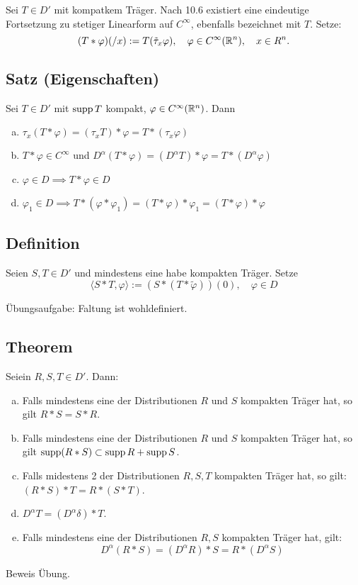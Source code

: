 Sei $T \in D'$ mit kompatkem Träger.
Nach 10.6 existiert eine eindeutige Fortsetzung zu stetiger Linearform auf $C^\infty$, ebenfalls bezeichnet mit $T$.
Setze:
$$
(T \ast \varphi)(/x) := T(\tilde\tau_x \varphi), \quad \varphi \in C^\infty(\mathbb{R}^n), \quad x \in R^n.
$$

\subsection{Satz (Eigenschaften)}

Sei $T \in D'$ mit $\operatorname{supp} T$ kompakt, $\varphi \in C^\infty(\mathbb{R}^n)$.
Dann
\begin{enumerate}[a)]
  \item $\tau_x(T\ast \varphi) = (\tau_x T) \ast \varphi = T \ast (\tau_x \varphi)$
  \item $T \ast \varphi \in C^\infty$ und $D^\alpha (T\ast \varphi) = (D^\alpha T) \ast \varphi = T \ast (D^\alpha \varphi)$
  \item $\varphi \in D \implies T\ast \varphi \in D$
  \item $\varphi_1 \in D \implies T \ast (\varphi \ast \varphi_1) = (T \ast \varphi ) \ast \varphi_1 = (T \ast \varphi) \ast \varphi$
\end{enumerate}

\subsection{Definition}

Seien $S,T \in D'$ und mindestens eine habe kompakten Träger.
Setze
$$
\langle S \ast T, \varphi \rangle := (S \ast (T \ast \tilde \varphi))(0), \quad \varphi \in D
$$

Übungsaufgabe: Faltung ist wohldefiniert.

\subsection{Theorem}

Seiein $R,S,T \in D'$.
Dann:

\begin{enumerate}[a)]
  \item Falls mindestens eine der Distributionen $R$ und $S$ kompakten Träger hat, so gilt $R \ast S = S \ast R$.
  \item Falls mindestens eine der Distributionen $R$ und $S$ kompakten Träger hat, so gilt $\operatorname{supp}(R \ast S) \subset \operatorname{supp} R + \operatorname{supp} S$.
  \item Falls midestens 2 der Distributionen $R,S,T$ kompakten Träger hat, so gilt: $(R \ast S) \ast T = R \ast (S \ast T)$.
  \item $D^\alpha T = (D^\alpha \delta) \ast T$.
  \item Falls mindestens eine der Distributionen $R,S$ kompakten Träger hat, gilt:
    $$
    D^\alpha(R\ast S) = (D^\alpha R)  \ast S = R \ast (D^\alpha S)
    $$
\end{enumerate}

Beweis Übung.
